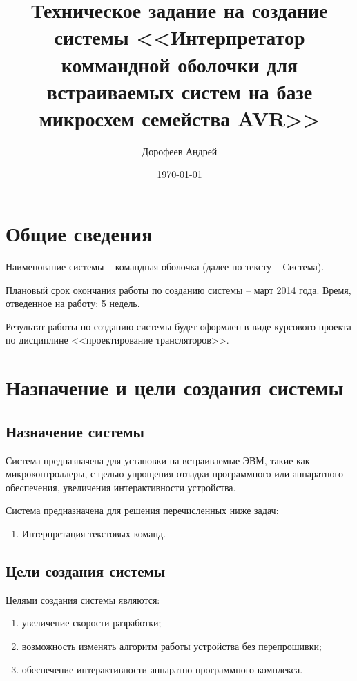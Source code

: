 \documentclass[a4paper, 12pt]{report}
\begin{document}
\author{Дорофеев Андрей}
\title{Техническое задание на создание системы <<Интерпретатор коммандной оболочки для встраиваемых систем на базе 
микросхем семейства AVR>>}
\date{\today}
\maketitle

\tableofcontents

\section{Общие сведения}
Наименование системы -- командная оболочка (далее по тексту -- 
Система).

Плановый срок окончания работы по созданию системы -- март 2014 года. 
Время, отведенное на работу: 5 недель.

Результат работы по созданию системы будет оформлен в виде курсового
проекта по дисциплине <<проектирование трансляторов>>.

\section{Назначение и цели создания системы}

\subsection{Назначение системы}

Система предназначена для установки на встраиваемые ЭВМ, такие как микроконтроллеры, с целью
упрощения отладки программного или аппаратного обеспечения, увеличения интерактивности устройства.

Система предназначена для решения перечисленных ниже задач:
\begin{enumerate}
	\item Интерпретация текстовых команд.
\end{enumerate}

\subsection{Цели создания системы}

Целями создания системы являются:
\begin{enumerate}
	\item увеличение скорости разработки;
	\item возможность изменять алгоритм работы устройства без перепрошивки;
	\item обеспечение интерактивности аппаратно-программного комплекса.
\end{enumerate}
\end{document}
